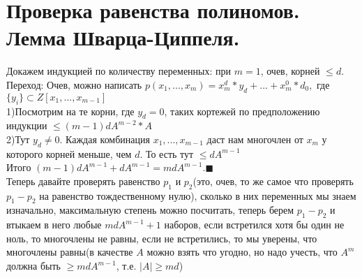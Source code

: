 \hypertarget{Проверка равенства полиномов}{\section{Проверка равенства полиномов. Лемма Шварца-Циппеля.}}


Докажем индукцией по количеству переменных: при $m=1$, очев, корней $\le d$.
\\Переход: 
Очев, можно написать $p(x_1,...,x_m)=x_m^d*y_d+...+x_m^0*d_0,$ где $\{y_i\}\subset Z[x_1,...,x_{m-1}]$
\\1)Посмотрим на те корни, где $y_d=0$, таких кортежей по предположению индукции $\le (m-1)dA^{m-2}*A$
\\2)Тут $y_d\ne 0$. Каждая комбинация $x_1,...,x_{m-1}$ даст нам многочлен от $x_m$ у которого корней меньше, чем $d$. То есть тут $\le dA^{m-1}$
\\Итого $(m-1)dA^{m-1}+dA^{m-1}=mdA^{m-1}. \blacksquare$ 
\\Теперь давайте проверять равенство $p_1$ и $p_2$(это, очев, то же самое что проверять $p_1-p_2$ на равенство тождественному нулю), сколько в них переменных мы знаем изначально, максимальную степень можно посчитать, теперь берем $p_1-p_2$ и втыкаем в него любые $mdA^{m-1}+1$ наборов, если встретился хотя бы один не ноль, то многочлены не равны, если не встретились, то мы уверены, что многочлены равны(в качестве $A$ можно взять что угодно, но надо учесть, что $A^m$ должна быть $\ge mdA^{m-1}$, т.е. $|A|\ge md$)